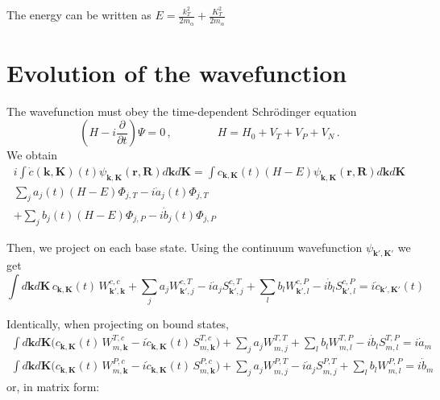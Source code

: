 \documentclass[english,oneside]{book}
\begin{document}
The energy can be written as $E=\frac{k_{T}^{2}}{2 m_{\alpha}}+
\frac{K_{T}^{2}}{2 m_{\alpha}} $


\section{Evolution of the wavefunction}
The wavefunction must obey the time-dependent Schr\"{o}dinger equation
\begin{equation}\label{Q:CE-tdse}
  \left( H - i\frac{\partial }{\partial t} \right)\Psi = 0\, , \qquad
  \qquad H=H_{0} + V_{T} + V_{P}+ V_{N} \,.
\end{equation}
%
We obtain
\begin{eqnarray}
i \int \dot{c}(\mathbf{k},\mathbf{K})(t)
\psi_{\mathbf{k},\mathbf{K}}(\mathbf{r},\mathbf{R}) d \mathbf{k} d
\mathbf{K}
  =
\int c_{\mathbf{k},\mathbf{K}}(t) \left( H - E \right)
\psi_{\mathbf{k},\mathbf{K}}(\mathbf{r},\mathbf{R})  d \mathbf{k} d \mathbf{K} \\
  \sum_{j}  a_{j}(t) \left( H - E \right) \Phi_{j,T}
  - i \dot{a}_{j}(t) \Phi_{j,T}
  \nonumber \\
+ \sum_{j} b_{j}(t) \left( H - E \right) \Phi_{j,P} -
  i \dot{b}_{j}(t) \Phi_{j,P}
 \nonumber
\end{eqnarray}

Then, we project on each base state. Using the continuum wavefunction
$\psi_{\mathbf{k}',\mathbf{K}'}$ we get
\[
\int  d \mathbf{k} d \mathbf{K}  \,  c_{\mathbf{k},\mathbf{K}}(t) \,
W^{c,c}_{\mathbf{k}',\mathbf{k}}  + \sum_{j} a_{j}
W^{c,T}_{\mathbf{k}',j} - i \dot{a}_{j} S^{c,T}_{\mathbf{k}',j} +
\sum_{l} b_{l} W^{c,P}_{\mathbf{k}',l} - i \dot{b}_{l}
S^{c,P}_{\mathbf{k}',l} = i \dot{c}_{\mathbf{k}',\mathbf{K}'}(t)
\]

Identically, when projecting on bound states,
\begin{eqnarray*}
\int  d \mathbf{k} d \mathbf{K}  \Big( c_{\mathbf{k},\mathbf{K}}(t) \,
W^{T,c}_{m,\mathbf{k}} - i \dot{c}_{\mathbf{k},\mathbf{K}}(t)
\,S^{T,c}_{m,\mathbf{k}} \Big) + \sum_{j} a_{j} W^{T,T}_{m,j} +
\sum_{l} b_{l} W^{T,P}_{m,l} - i \dot{b}_{l} S^{T,P}_{m,l} = i
\dot{a}_{m}\nonumber
  \\ %
\int  d \mathbf{k} d \mathbf{K}  \Big( c_{\mathbf{k},\mathbf{K}}(t) \,
W^{P,c}_{m,\mathbf{k}} - i \dot{c}_{\mathbf{k},\mathbf{K}}(t)
\,S^{P,c}_{m,\mathbf{k}} \Big) + \sum_{j} a_{j} W^{P,T}_{m,j} - i
\dot{a}_{j} S^{P,T}_{m,j} + \sum_{l} b_{l} W^{P,P}_{m,l} = i
\dot{b}_{m} \nonumber
\end{eqnarray*}
or, in matrix form:
\end{document}
